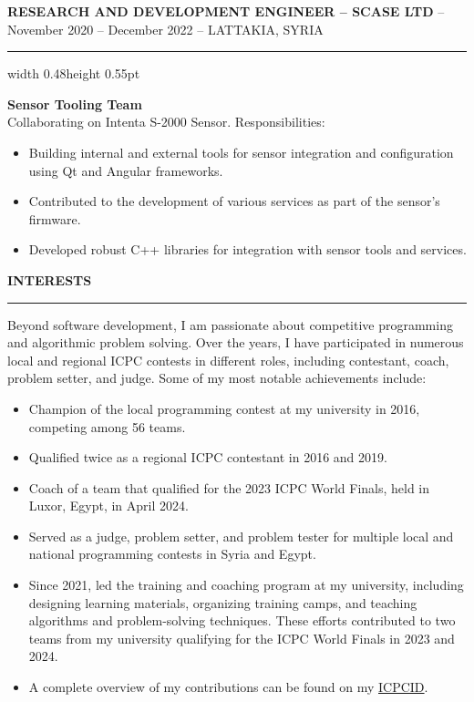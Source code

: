 \documentclass[10pt,a4paper]{article}
\newcommand{\cvSection}[1]{%
  \vspace{0.38cm}
  \noindent
  \makebox[0.38cm][l]{{\color{cvAccent}\Large\textbullet}}%
  \begin{minipage}[t]{\dimexpr\textwidth-0.38cm\relax}
    \textbf{\MakeUppercase{#1}}\\[-0.08cm]
    {\color{cvLine}\rule{\linewidth}{0.55pt}}
  \end{minipage}
  \par\vspace{0.24cm}
}
\newenvironment{cvBlock}{%
  \begin{list}{}{%
    \setlength{\leftmargin}{0.58cm}%
    \setlength{\rightmargin}{0.14cm}%
    \setlength{\topsep}{0pt}%
    \setlength{\partopsep}{0pt}%
    \setlength{\parsep}{0pt}%
    \setlength{\itemsep}{0pt}%
  }%
  \item[]%
}{%
  \end{list}%
}
\begin{document}
\begin{cvBlock}
  \vspace{1.5cm}
  \textbf{RESEARCH AND DEVELOPMENT ENGINEER -- SCASE LTD}
  \hspace{0.25em}-- November 2020 -- December 2022
  \hspace{0.25em}-- LATTAKIA, SYRIA

  \vspace{0.16cm}
  {\color{cvLine}\hrule width 0.48\linewidth height 0.55pt}
  \vspace{0.18cm}

  \textbf{Sensor Tooling Team}\\
  Collaborating on Intenta S-2000 Sensor. Responsibilities:
  \begin{itemize}[leftmargin=0.9cm,itemsep=0pt,topsep=0.04cm]
    \item Building internal and external tools for sensor integration and configuration using Qt and Angular frameworks.
    \item Contributed to the development of various services as part of the sensor's firmware.
    \item Developed robust C++ libraries for integration with sensor tools and services.
  \end{itemize}
\end{cvBlock}

\vspace{0.24cm}
\cvSection{Interests}
\hspace*{0.58cm}%
\begin{minipage}{\dimexpr\textwidth-0.72cm\relax}
  Beyond software development, I am passionate about competitive programming and algorithmic problem solving. Over the years, I have participated in numerous local and regional ICPC contests in different roles, including contestant, coach, problem setter, and judge. Some of my most notable achievements include:
  \begin{itemize}[leftmargin=0.9cm,itemsep=0pt,topsep=0.04cm]
    \item Champion of the local programming contest at my university in 2016, competing among 56 teams.
    \item Qualified twice as a regional ICPC contestant in 2016 and 2019.
    \item Coach of a team that qualified for the 2023 ICPC World Finals, held in Luxor, Egypt, in April 2024.
    \item Served as a judge, problem setter, and problem tester for multiple local and national programming contests in Syria and Egypt.
    \item Since 2021, led the training and coaching program at my university, including designing learning materials, organizing training camps, and teaching algorithms and problem-solving techniques. These efforts contributed to two teams from my university qualifying for the ICPC World Finals in 2023 and 2024.
    \item A complete overview of my contributions can be found on my \href{https://icpc.global/ICPCID/R5E2LLK6WJNN}{ICPCID}.
  \end{itemize}
\end{minipage}
\end{document}
